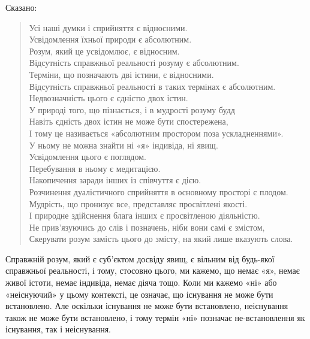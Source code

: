 \documentclass{article}
\begin{document}
Сказано:

\begin{verse}
        Усі наші думки і сприйняття є відносними. \\
        Усвідомлення їхньої природи є абсолютним. \\
        Розум, який це усвідомлює, є відносним. \\
        Відсутність справжньої реальності розуму є абсолютним. \\
        Терміни, що позначають дві істини, є відносними. \\
        Відсутність справжньої реальності в таких термінах є абсолютним. \\
        Недвозначність цього є єдністю двох істин. \\
        У природі того, що пізнається, і в мудрості розуму будд \\
        Навіть єдність двох істин не може бути спостережена, \\
        І тому це називається «абсолютним простором поза ускладненнями». \\
        У ньому не можна знайти ні «я» індивіда, ні явищ. \\
        Усвідомлення цього є поглядом. \\
        Перебування в ньому є медитацією. \\
        Накопичення заради інших із співчуття є дією. \\
        Розчинення дуалістичного сприйняття в основному просторі є плодом. \\
        Мудрість, що пронизує все, представляє просвітлені якості. \\
        І природне здійснення блага інших є просвітленою діяльністю. \\
        Не прив’язуючись до слів і позначень, ніби вони самі є змістом, \\
        Скерувати розум замість цього до змісту, на який лише вказують слова.
\end{verse}

Справжній розум, який є суб’єктом досвіду явищ, є вільним від будь-якої справжньої реальності, і тому, стосовно цього, ми кажемо, що немає «я», немає живої істоти, немає індивіда, немає діяча тощо. Коли ми кажемо «ні» або «неіснуючий» у цьому контексті, це означає, що існування не може бути встановлено. Але оскільки існування не може бути встановлено, неіснування також не може бути встановлено, і тому термін «ні» позначає не-встановлення як існування, так і неіснування.
\end{document}

